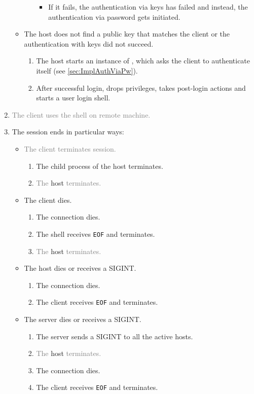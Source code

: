 \documentclass[10pt,a4paper,titlepage,twoside,english,final]{zhawreprt}
\begin{document}
\begin{enumerate}
\begin{itemize}
\begin{enumerate}
\begin{itemize}
\begin{enumerate}
			\end{enumerate}
			\item If it fails, the authentication via keys has failed and instead, the authentication via password gets initiated.
		\end{itemize}
	\end{enumerate}
	\item The host does not find a public key that matches the client or the authentication with keys did not succeed.
	\begin{enumerate}
		\item The host starts an instance of \cite{login}, which asks the client to authenticate itself (see \ref{sec:ImplAuthViaPw}).
		\item After successful \gls{login}, \cite{login} drops privileges, takes post-\gls{login} actions and starts a user \gls{login} \gls{shell}.
	\end{enumerate}
\end{itemize}
\item \textcolor{gray}{The client uses the \gls{shell} on remote machine.}
\item The session ends in particular ways:
\begin{itemize}
	\item \textcolor{gray}{The client terminates session.}
	\begin{enumerate}
		\item The child process of the host terminates.
		\item \textcolor{gray}{The} host \textcolor{gray}{terminates.}
	\end{enumerate}
	\item The client dies.
	\begin{enumerate}
		\item The connection dies.
		\item The \gls{shell} receives \texttt{EOF} and terminates.
		\item \textcolor{gray}{The} host \textcolor{gray}{terminates.}
	\end{enumerate}
	\item The host dies or receives a \gls{SIGINT}.
	\begin{enumerate}
		\item The connection dies.
		\item The client receives \texttt{EOF} and terminates.
	\end{enumerate}
	\item The server dies or receives a \gls{SIGINT}.
	\begin{enumerate}
		\item The server sends a \gls{SIGINT} to all the active hosts.
		\item \textcolor{gray}{The} host \textcolor{gray}{terminates.}
		\item The connection dies.
		\item The client receives \texttt{EOF} and terminates.
	\end{enumerate}
\end{itemize}
\end{enumerate}
\end{document}
